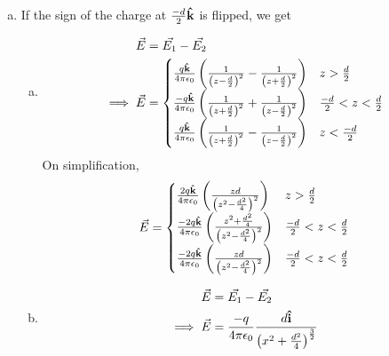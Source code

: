\begin{problem}{}{}
\begin{enumerate}[(a)]
    \item If the sign of the charge at $\frac{-d}{2}\boldsymbol{\hat{\textbf{k}}}$ is flipped, we get
    \begin{enumerate}[(a)]
        \item 
        \begin{align*}
            \vec{E} &= \vec{E_1} - \vec{E_2} \\
            \implies \vec{E} &= 
            \begin{cases}
            \frac{q\boldsymbol{\hat{\textbf{k}}}}{4\pi\epsilon_0} \left(\frac{1}{\left(z-\frac{d}{2}\right)^2} - \frac{1}{\left(z+\frac{d}{2}\right)^2}\right) & z >\frac{d}{2}\\
             \frac{-q\boldsymbol{\hat{\textbf{k}}}}{4\pi\epsilon_0} \left(\frac{1}{\left(z+\frac{d}{2}\right)^2} + \frac{1}{\left(z-\frac{d}{2}\right)^2}\right) & \frac{-d}{2}<z<\frac{d}{2}\\
            \frac{q\boldsymbol{\hat{\textbf{k}}}}{4\pi\epsilon_0} \left(\frac{1}{\left(z+\frac{d}{2}\right)^2} - \frac{1}{\left(z-\frac{d}{2}\right)^2}\right) & z <\frac{-d}{2}
        \end{cases}
        \end{align*}
        On simplification,
        \begin{align}
            \vec{E} = 
                \begin{cases}
                     \frac{2q\boldsymbol{\hat{\textbf{k}}}}{4\pi\epsilon_0} \left(\frac{zd}{\left(z^2 - \frac{d^2}{4}\right)^2}\right)& z >\frac{d}{2}\\
                    \frac{-2q\boldsymbol{\hat{\textbf{k}}}}{4\pi\epsilon_0} \left(\frac{z^2 + \frac{d^2}{4}}{\left(z^2 - \frac{d^2}{4}\right)^2}\right) & \frac{-d}{2}<z <\frac{d}{2}\\
                    \frac{-2q\boldsymbol{\hat{\textbf{k}}}}{4\pi\epsilon_0} \left(\frac{zd}{\left(z^2 - \frac{d^2}{4}\right)^2}\right) & \frac{-d}{2}<z<\frac{d}{2}
                \end{cases}
        \end{align}

        \item 
        \begin{align*}
            \vec{E} &= \vec{E_1} - \vec{E_2} \\
            \implies \vec{E} &= \frac{-q}{4\pi\epsilon_0}\frac{d\boldsymbol{\hat{\textbf{i}}}}{\left( x^2+\frac{d^2}{4}\right)^{\frac{3}{2}}}
        \end{align*}
    \end{enumerate}
\end{enumerate}
\end{problem}
